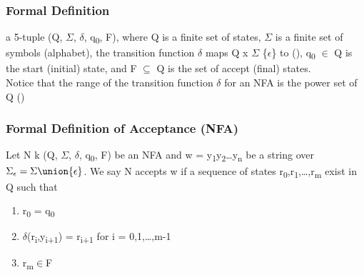 \documentclass[letterpaper, 12pt]{article}
\begin{document}
\subsubsection{Formal Definition}
\label{sec:org5b8c37a}
a 5-tuple (Q, \(\Sigma\), \(\delta\), q\textsubscript{0}, F), where Q is a finite set of states, \(\Sigma\) is a finite set of symbols (alphabet), the transition function \(\delta\) maps Q x \(\Sigma\) \union \{\(\epsilon\)\} to (), q\textsubscript{0} \(\in\) Q is the start (initial) state, and F \(\subseteq{}\) Q is the set of accept (final) states.\\

Notice that the range of the transition function \(\delta\) for an NFA is the power set of Q ()\\
\subsubsection{Formal Definition of Acceptance (NFA)}
\label{sec:orgd6d0388}
Let N  k (Q, \(\Sigma\), \(\delta\), q\textsubscript{0}, F) be an NFA and w = y\textsubscript{1}y\textsubscript{2}\ldots{}y\textsubscript{n} be a string over \(\Sigma_{\epsilon}=\Sigma{}\union{\epsilon}\). We say N accepts w if a sequence of states r\textsubscript{0},r\textsubscript{1},\ldots{},r\textsubscript{m} exist in Q such that\\
\begin{enumerate}
\item r\textsubscript{0} = q\textsubscript{0}\\
\item \(\delta\)(r\textsubscript{i},y\textsubscript{i+1}) = r\textsubscript{i+1} for i = 0,1,\ldots{},m-1\\
\item r\textsubscript{m}\(\in\)F\\
\end{enumerate}
\end{document}
